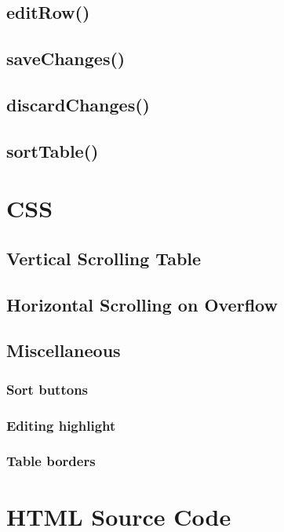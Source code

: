 \documentclass[letterpaper]{article}
\begin{document}
\subsection{editRow()}
\subsection{saveChanges()}
\subsection{discardChanges()}
\subsection{sortTable()}

\newpage

\section{CSS}\label{CSS}

\subsection{Vertical Scrolling Table}
\subsection{Horizontal Scrolling on Overflow}\label{overflow-x}
\subsection{Miscellaneous}
\subsubsection{Sort buttons}
\subsubsection{Editing highlight}
\subsubsection{Table borders}

\newpage

\appendix
\section{HTML Source Code}

\newpage
\end{document}
